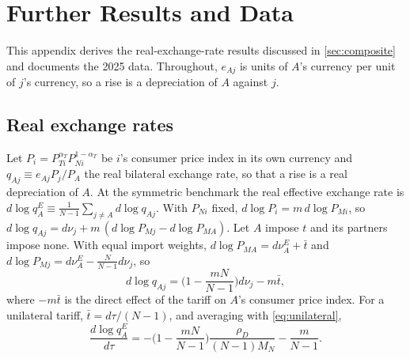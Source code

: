 \section{Further Results and Data}

This appendix derives the real-exchange-rate results discussed in \cref{sec:composite} and documents the 2025 data. Throughout, $e_{Aj}$ is units of $A$'s currency per unit of $j$'s currency, so a rise is a depreciation of $A$ against $j$.

\subsection{Real exchange rates}
\label{sec:real}

Let $P_i=P_{Ti}^{\alpha_T}P_{Ni}^{1-\alpha_T}$ be $i$'s consumer price index in its own currency and $q_{Aj}\equiv e_{Aj}P_j/P_A$ the real bilateral exchange rate, so that a rise is a real depreciation of $A$. At the symmetric benchmark the real effective exchange rate is $d\log q^E_A\equiv\frac{1}{N-1}\sum_{j\neq A}d\log q_{Aj}$. With $P_{Ni}$ fixed, $d\log P_i=m\,d\log P_{Mi}$, so $d\log q_{Aj}=d\nu_j+m\,(d\log P_{Mj}-d\log P_{MA})$. Let $A$ impose $t$ and its partners impose none. With equal import weights, $d\log P_{MA}=d\nu^E_A+\bar t$ and $d\log P_{Mj}=d\nu^E_A-\frac{N}{N-1}d\nu_j$, so
\begin{equation}
d\log q_{Aj}=\Big(1-\frac{mN}{N-1}\Big)d\nu_j-m\bar t,
\label{eq:realapp}
\end{equation}
where $-m\bar t$ is the direct effect of the tariff on $A$'s consumer price index. For a unilateral tariff, $\bar t=d\tau/(N-1)$, and averaging with \cref{eq:unilateral},
\begin{equation}
\frac{d\log q^E_A}{d\tau}=-\Big(1-\frac{mN}{N-1}\Big)\frac{\rho_D}{(N-1)M_N}-\frac{m}{N-1}.
\label{eq:reer}
\end{equation}

